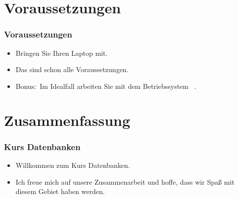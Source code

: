 \documentclass[aspectratio=169,mathserif,notheorems]{beamer}%
\begin{document}
\section{Voraussetzungen}%
%
\begin{frame}%
\frametitle{Voraussetzungen}%
\begin{itemize}%
\item Bringen Sie Ihren Laptop mit.%
\item<7-> Das sind schon alle Voraussetzungen.%
\item<8-> Bonus:~Im Idealfall arbeiten Sie mit dem Betriebssystem \ubuntu\ \linux\cite{CN2020ULB,H2020ULU2E}.%
\end{itemize}%
\end{frame}%
%
\section{Zusammenfassung}%
%
\begin{frame}\frametitle{Kurs Datenbanken}%
\begin{itemize}%
\item Willkommen zum Kurs \alert{Datenbanken}.%
\item<2-> Ich freue mich auf unsere Zusammenarbeit und hoffe, dass wir Spaß mit diesem Gebiet haben werden.%
\end{itemize}%
\end{frame}%
%
\endPresentation%
\end{document}
